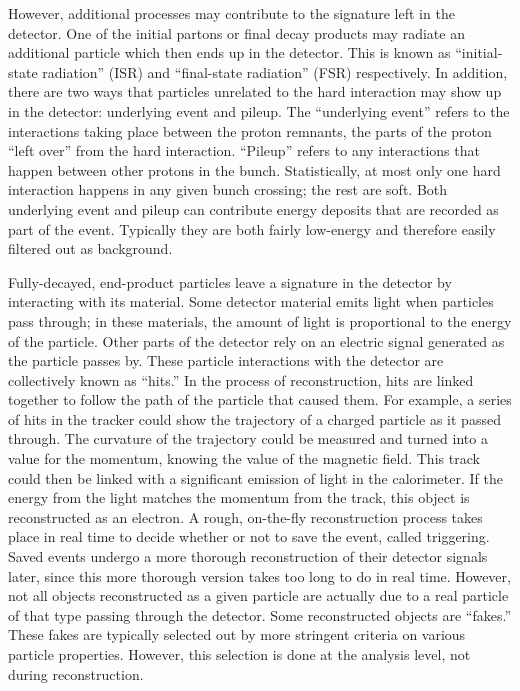 However, additional processes may contribute 
to the signature left in the detector.  
One of the initial partons 
or final decay products 
may radiate an additional particle 
which then ends up in the detector.  
This is known as ``initial-state radiation'' (ISR) 
and ``final-state radiation'' (FSR) respectively.  
In addition, there are two ways that 
particles unrelated to the hard interaction 
may show up in the detector: 
underlying event and pileup.  
The ``underlying event'' refers to the 
interactions taking place between the 
proton remnants, 
the parts of the proton ``left over'' 
from the hard interaction.  
``Pileup'' refers to any interactions that happen 
between other protons in the bunch.  
Statistically, at most only one hard interaction 
happens in any given bunch crossing; the rest are soft.  
Both underlying event and pileup can contribute 
energy deposits that are recorded as part of the event.  
Typically they are both fairly low-energy and 
therefore easily filtered out as background.  


Fully-decayed, end-product 
particles leave a signature in the detector 
by interacting with its material.  
Some detector material emits light when 
particles pass through; 
in these materials, the amount of light 
is proportional to the energy of the particle.  
Other parts of the detector rely on an 
electric signal generated 
as the particle passes by.  
These particle interactions with the detector 
are collectively known as ``hits.''  
In the process of reconstruction, 
hits are linked together to 
follow the path of the particle that caused them.  
For example, a series of hits in the tracker 
could show the trajectory of a charged particle 
as it passed through.  
The curvature of the trajectory could be measured 
and turned into a value for the momentum, 
knowing the value of the magnetic field.  
This track could then be linked 
with a significant emission of light 
in the calorimeter.  
If the energy from the light 
matches the momentum from the track, 
this object is reconstructed as an electron.  
A rough, on-the-fly reconstruction 
process takes place in real time to decide 
whether or not to save the event, 
called triggering.  
Saved events undergo a more thorough 
reconstruction of their detector signals later, 
since this more thorough version 
takes too long to do in real time.  
However, not all objects reconstructed as 
a given particle are actually due to 
a real particle of that type 
passing through the detector.  
Some reconstructed objects are ``fakes.''  
These fakes are typically selected out 
by more stringent criteria on various 
particle properties. %
However, this selection is done at the analysis level, 
not during reconstruction.  

